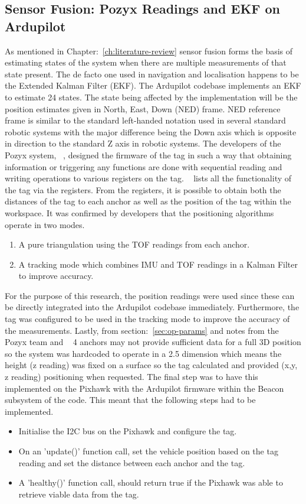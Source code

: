 \subsection{Sensor Fusion: Pozyx Readings and EKF on Ardupilot}\label{subsec:sensor-fusion}
As mentioned in Chapter:~\ref{ch:literature-review} sensor fusion forms the basis of estimating states of the system when there are multiple measurements of that state present.
The de facto one used in navigation and localisation happens to be the Extended Kalman Filter (EKF).
The Ardupilot codebase implements an EKF to estimate 24 states.
The state being affected by the implementation will be the position estimates given in North, East, Down (NED) frame.
NED reference frame is similar to the standard left-handed notation used in several standard robotic systems with the major difference being the Down axis which is opposite in direction to the standard Z axis in robotic systems.
The developers of the Pozyx system, ~\cite{pozyx2018pozyx}, designed the firmware of the tag in such a way that obtaining information or triggering any functions are done with sequential reading and writing operations to various registers on the tag.
~\citet{devregs} lists all the functionality of the tag via the registers.
From the registers, it is possible to obtain both the distances of the tag to each anchor as well as the position of the tag within the workspace.
It was confirmed by developers that the positioning algorithms operate in two modes.
\begin{enumerate}
    \item A pure triangulation using the TOF readings from each anchor.
    \item A tracking mode which combines IMU and TOF readings in a Kalman Filter to improve accuracy.
\end{enumerate}
For the purpose of this research, the position readings were used since these can be directly integrated into the Ardupilot codebase immediately.
Furthermore, the tag was configured to be used in the tracking mode to improve the accuracy of the measurements.
Lastly, from section:~\ref{sec:op-params} and notes from the Pozyx team and ~\citet{evaluwb} 4 anchors may not provide sufficient data for a full 3D position so the system was hardcoded to operate in a 2.5 dimension which means the height (z reading) was fixed on a surface so the tag calculated and provided (x,y, z reading) positioning when requested.
The final step was to have this implemented on the Pixhawk with the Ardupilot firmware within the Beacon subsystem of the code.
This meant that the following steps had to be implemented.
\begin{itemize}
    \item Initialise the I2C bus on the Pixhawk and configure the tag.
    \item On an 'update()' function call, set the vehicle position based on the tag reading and set the distance between each anchor and the tag.
    \item A 'healthy()' function call, should return true if the Pixhawk was able to retrieve viable data from the tag.
\end{itemize}

